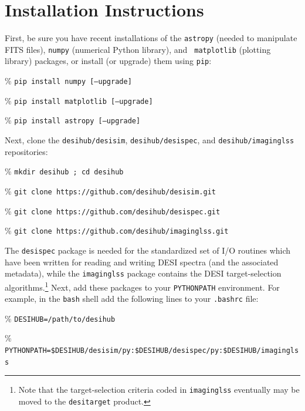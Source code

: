 \documentclass[11pt]{article}
\begin{document}
\clearpage
\appendix

\section{Installation Instructions}\label{sec:install}

First, be sure you have recent installations of the {\tt astropy} (needed to
manipulate FITS files), {\tt numpy} (numerical Python library), and {\tt
  matplotlib} (plotting library) packages, or install (or upgrade) them using
{\tt pip}:
\begin{itemize*}
  \item[\%]{{\tt pip install numpy [--upgrade]}}
  \item[\%]{{\tt pip install matplotlib [--upgrade]}}
  \item[\%]{{\tt pip install astropy [--upgrade]}}
\end{itemize*}

\noindent Next, clone the {\tt desihub/desisim}, {\tt desihub/desispec}, and
          {\tt desihub/imaginglss} repositories:
\begin{itemize*}
  \item[\%]{{\tt mkdir desihub ; cd desihub}}
  \item[\%]{{\tt git clone https://github.com/desihub/desisim.git}}
  \item[\%]{{\tt git clone https://github.com/desihub/desispec.git}}
  \item[\%]{{\tt git clone https://github.com/desihub/imaginglss.git}}
\end{itemize*}

\noindent The {\tt desispec} package is needed for the standardized set of I/O
routines which have been written for reading and writing DESI spectra (and the
associated metadata), while the {\tt imaginglss} package contains the DESI
target-selection algorithms.\footnote{Note that the target-selection criteria
  coded in {\tt imaginglss} eventually may be moved to the {\tt desitarget}
  product.}  Next, add these packages to your {\tt PYTHONPATH} environment.  For
example, in the {\tt bash} shell add the following lines to your {\tt .bashrc}
file:
\begin{itemize*}
  \item[\%]{{\tt DESIHUB=/path/to/desihub}}
  \item[\%]{{\tt
      PYTHONPATH=\$DESIHUB/desisim/py:\$DESIHUB/desispec/py:\$DESIHUB/imaginglss}}
\end{itemize*}
\end{document}
